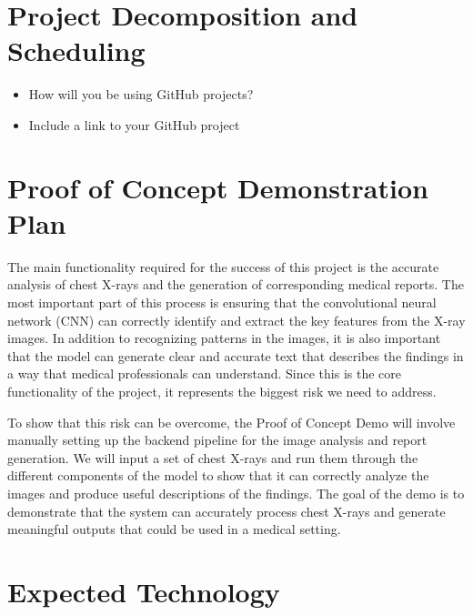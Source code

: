 \documentclass{article}
\begin{document}
\section{Project Decomposition and Scheduling}

\begin{itemize}
  \item How will you be using GitHub projects?
  \item Include a link to your GitHub project
\end{itemize}


\section{Proof of Concept Demonstration Plan}

The main functionality required for the success of this project is the accurate
analysis of chest X-rays and the generation of corresponding medical reports.
The most important part of this process is ensuring that the convolutional 
neural network (CNN) can correctly identify and extract the key features from
the X-ray images. In addition to recognizing patterns in the images, it is
also important that the model can generate clear and accurate text that 
describes the findings in a way that medical professionals can understand.
Since this is the core functionality of the project, it represents the biggest
risk we need to address.

To show that this risk can be overcome, the Proof of Concept Demo will involve
manually setting up the backend pipeline for the image analysis and report generation.
We will input a set of chest X-rays and run them through the different components of
the model to show that it can correctly analyze the images and produce useful
descriptions of the findings. The goal of the demo is to demonstrate that the system
can accurately process chest X-rays and generate meaningful outputs that could be
used in a medical setting.

\section{Expected Technology}

\end{document}
